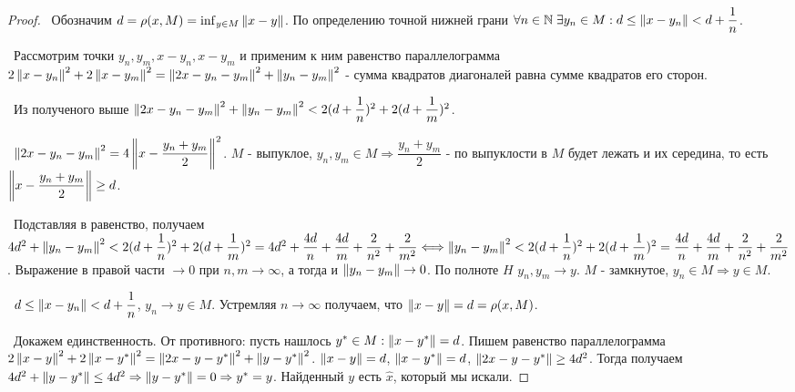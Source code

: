 \begin{proof}
\smallskip
\par\noindent \textbullet~Обозначим $d = \rho(x, M) = \inf_{y \in M} \left\lVert x - y\right\rVert$. По определению точной нижней грани $\forall n \in \mathbb{N} \; \exists y_n \in M : 
d \le \left\lVert x - y_n\right\rVert < d + \dfrac{1}{n}$.

\smallskip 
\noindent \textbullet~Рассмотрим точки $y_n, y_m, x - y_n, x - y_m$ и применим к ним равенство параллелограмма $2 \left\lVert x - y_n\right\rVert^2 + 2 \left\lVert x - y_m\right\rVert^2 = \left\lVert2x - y_n 
-y_m\right\rVert^2 + \left\lVert y_n - y_m\right\rVert^2$ - сумма квадратов диагоналей равна сумме квадратов его сторон.

\smallskip 
\noindent \textbullet~Из полученого выше $\left\lVert2x - y_n - y_m\right\rVert^2 + \left\lVert y_n - y_m\right\rVert^2 < 2(d + \dfrac{1}{n})^2 + 2(d + \dfrac{1}{m})^2$.

\smallskip
\noindent \textbullet~$\left\lVert2x - y_n - y_m\right\rVert^2 = 4 \left\lVert x - \dfrac{y_n + y_m}{2}\right\rVert^2$. $M$ - выпуклое, $y_n, y_m \in M \Rightarrow \dfrac{y_n + y_m}{2}$ - по выпуклости 
в $M$ будет лежать и их середина, то есть $\left\lVert x - \dfrac{y_n + y_m}{2}\right\rVert \ge d$.

\smallskip
\noindent \textbullet~Подставляя в равенство, получаем $4d^2 + \left\lVert y_n - y_m\right\rVert^2 < 2(d + \dfrac{1}{n})^2 + 2(d + \dfrac{1}{m})^2 = 4d^2 + \dfrac{4d}{n} + \dfrac{4d}{m} + 
\dfrac{2}{n^2} + \dfrac{2}{m^2} \Longleftrightarrow \left\lVert y_n - y_m\right\rVert^2 < 2(d + \dfrac{1}{n})^2 + 2(d + \dfrac{1}{m})^2 = \dfrac{4d}{n} + \dfrac{4d}{m} + \dfrac{2}{n^2} +
\dfrac{2}{m^2}$. Выражение в правой части $\to 0$ при $n, m \to \infty$, а тогда и $\left\lVert y_n - y_m\right\rVert \to 0$. По полноте $H$ $y_n, y_m \to y$. $M$ - замкнутое, $y_n \in M 
\Rightarrow y \in M$.

\noindent \textbullet~$d \le \left\lVert x - y_n\right\rVert < d + \dfrac{1}{n}$, $y_n \to y \in M$. Устремляя $n \to \infty$ получаем, что $\left\lVert x - y\right\rVert = d = \rho(x, M)$.

\noindent \textbullet~Докажем единственность. От противного: пусть нашлось $y^* \in M : \left\lVert x - y^*\right\rVert = d$. Пишем равенство параллелограмма $2 \left\lVert x - y\right\rVert^2 + 
2 \left\lVert x - y^*\right\rVert^2 = \left\lVert2x - y - y^*\right\rVert^2 + \left\lVert y - y^*\right\rVert^2$. $\left\lVert x - y\right\rVert = d$, $\left\lVert x - y^*\right\rVert = d$, $\left\lVert2x - y - y^*\right\rVert \ge 4 d^2$. Тогда получаем 
$4d^2 + \left\lVert y - y^*\right\rVert \le 4d^2 \Rightarrow \left\lVert y - y^*\right\rVert = 0 \Rightarrow y^* = y$. Найденный $y$ есть $\hat{x}$, который мы искали.
\end{proof}

